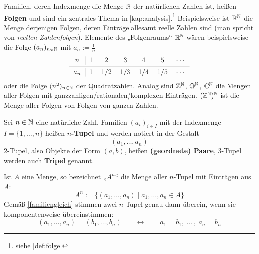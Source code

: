 \begin{bsp}[Folgen]
    Familien, deren Indexmenge die Menge $\mathbb N$ der natürlichen Zahlen ist, heißen \textbf{Folgen} und sind ein zentrales Thema in \cref{kap:analysis}.\footnote{siehe \cref{def:folge}} Beispielsweise ist $\mathbb R^\mathbb N$ die Menge derjenigen Folgen, deren Einträge allesamt reelle Zahlen sind (man spricht von \emph{reellen Zahlenfolgen}). Elemente des „Folgenraums“ $\mathbb R^\mathbb N$ wären beispielsweise die Folge $(a_n)_{n\in\mathbb N}$ mit $a_n:=\frac{1}{n}$
    \[\begin{tabular}{c|cccccc}
            $n$ & $1$ & $2$ & $3$ & $4$ & $5$ & $\cdots$ \\
            \midrule
            $a_n$ & $1$ & $1/2$ & $1/3$ & $1/4$ & $1/5$ & $\cdots$
    \end{tabular}\]
    oder die Folge $(n^2)_{n\in \mathbb N}$ der Quadratzahlen. Analog sind $\mathbb Z^\mathbb N$, $\mathbb Q^\mathbb N$, $\mathbb C^\mathbb N$ die Mengen aller Folgen mit ganzzahligen/rationalen/komplexen Einträgen. $(\mathbb Z^\mathbb N)^\mathbb N$ ist die Menge aller Folgen von Folgen von ganzen Zahlen.
\end{bsp}


\begin{defin}[Tupel] \label{def:tupel} 
    Sei $n\in \mathbb N$ eine natürliche Zahl. Familien $(a_i)_{i\in I}$ mit der Indexmenge $I=\{1,\dots,n\}$ heißen \textbf{$n$-Tupel} und werden notiert in der Gestalt
        \[ (a_1,\dots,a_n)  \]
    2-Tupel, also Objekte der Form $(a,b)$, heißen \textbf{(geordnete) Paare}, 3-Tupel werden auch \textbf{Tripel} genannt.
    
    Ist $A$ eine Menge, so bezeichnet „$A^n$“ die Menge aller $n$-Tupel mit Einträgen aus $A$:
        \[ A^n := \{ (a_1,\dots , a_n) \mid a_1,\dots , a_n \in A \} \]
    Gemäß \cref{familiengleich} stimmen zwei $n$-Tupel genau dann überein, wenn sie komponentenweise übereinstimmen:
	\[ (a_1,\dots , a_n)=(b_1,\dots , b_n) \qquad\leftrightarrow\qquad a_1=b_1,\ \ldots\ ,\ a_n=b_n \]
\end{defin}


